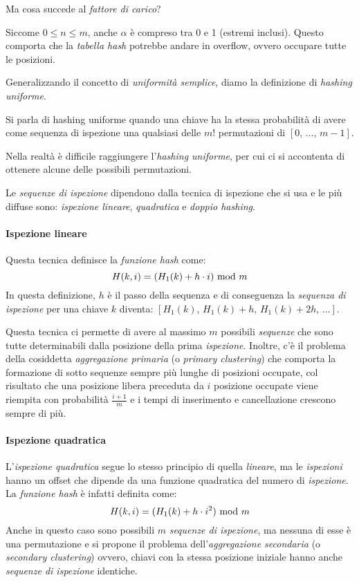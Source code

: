 \newpage\noindent Ma cosa succede al \emph{fattore di carico}?

Siccome $0\leq n\leq m$, anche $\alpha$ è compreso tra 0 e 1 (estremi inclusi).
Questo comporta che la \emph{tabella hash} potrebbe andare in overflow,
ovvero occupare tutte le posizioni.

\bigskip\noindent
Generalizzando il concetto di \emph{uniformità semplice}, diamo la definizione di
\emph{hashing uniforme}.
\begin{definition}
    Si parla di hashing uniforme quando una chiave ha la stessa probabilità di
    avere come sequenza di ispezione una qualsiasi delle $m!$ permutazioni di
    $[0,\,\dots,\,m-1]$.
\end{definition}\noindent
Nella realtà è difficile raggiungere l'\emph{hashing uniforme}, per cui ci si
accontenta di ottenere alcune delle possibili permutazioni.

Le \emph{sequenze di ispezione} dipendono dalla tecnica di ispezione che si usa e
le più diffuse sono: \emph{ispezione lineare}, \emph{quadratica} e
\emph{doppio hashing}.

\paragraph{Ispezione lineare}
Questa tecnica definisce la \emph{funzione hash} come:
\[H(k,i)=(H_1(k)+h\cdot i)\ \mathrm{mod}\ m\]
In questa definizione, $h$ è il passo della sequenza e di conseguenza la
\emph{sequenza di ispezione} per una chiave $k$ diventa:
$[H_1(k),\,H_1(k)+h,\,H_1(k)+2h,\,\dots]$.

Questa tecnica ci permette di avere al massimo $m$ possibili \emph{sequenze} che
sono tutte determinabili dalla posizione della prima \emph{ispezione}. Inoltre,
c'è il problema della cosiddetta \emph{aggregazione primaria} (o \emph{primary
clustering}) che comporta la formazione di sotto sequenze sempre più lunghe di
posizioni occupate, col risultato che una posizione libera preceduta da $i$
posizione occupate viene riempita con probabilità $\frac{i+1}{m}$ e i tempi di
inserimento e cancellazione crescono sempre di più.

\paragraph{Ispezione quadratica}
L'\emph{ispezione quadratica} segue lo stesso principio di quella \emph{lineare},
ma le \emph{ispezioni} hanno un offset che dipende da una funzione quadratica del
numero di \emph{ispezione}. La \emph{funzione hash} è infatti definita come:
\[H(k,i)=(H_1(k)+h\cdot i^2)\ \mathrm{mod}\ m\]
Anche in questo caso sono possibili $m$ \emph{sequenze di ispezione}, ma nessuna
di esse è una permutazione e si propone il problema dell'\emph{aggregazione
secondaria} (o \emph{secondary clustering}) ovvero, chiavi con
la stessa posizione iniziale hanno anche \emph{sequenze di ispezione} identiche.

